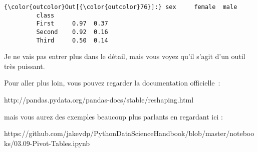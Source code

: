 \begin{Verbatim}[commandchars=\\\{\}]
{\color{outcolor}Out[{\color{outcolor}76}]:} sex     female  male
         class               
         First     0.97  0.37
         Second    0.92  0.16
         Third     0.50  0.14
\end{Verbatim}
            
    Je ne vais pas entrer plus dans le détail, mais vous voyez qu'il s'agit
d'un outil très puissant.

Pour aller plus loin, vous pouvez regarder la documentation officielle~:

http://pandas.pydata.org/pandas-docs/stable/reshaping.html

mais vous aurez des exemples beaucoup plus parlants en regardant ici :

https://github.com/jakevdp/PythonDataScienceHandbook/blob/master/notebooks/03.09-Pivot-Tables.ipynb


    
    
    

